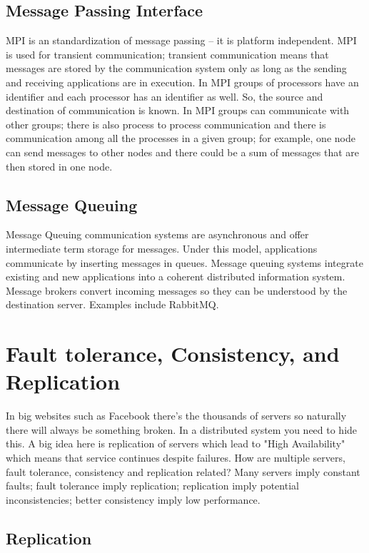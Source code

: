 \documentclass{amsbook}
\begin{document}
\subsection{Message Passing Interface}

MPI is an standardization of message passing -- it is platform independent. MPI is used for transient communication; transient communication means that messages are stored by the communication system only as long as the sending and receiving applications are in execution. In MPI groups of processors have an identifier and each processor has an identifier as well. So, the source and destination of communication is known. In MPI groups can communicate with other groups; there is also process to process communication and there is communication among all the processes in a given group; for example, one node can send messages to other nodes and there could be a sum of messages that are then stored in one node.
\subsection{Message Queuing}

Message Queuing communication systems are asynchronous and offer intermediate term storage for messages. Under this model, applications communicate by inserting messages in queues. Message queuing systems integrate existing and new applications into a coherent distributed information system. Message brokers convert incoming messages so they can be understood by the destination server. Examples include RabbitMQ.

\section{Fault tolerance, Consistency, and Replication}

In big websites such as Facebook there's the thousands of servers so naturally there will always be something broken. In a distributed system you need to hide this. A big idea here is replication of servers which lead to "High Availability" which means that service continues despite failures. How are multiple servers, fault tolerance, consistency and replication related? Many servers imply constant faults; fault tolerance imply replication; replication imply potential inconsistencies; better consistency imply low performance.

\subsection{Replication}
\end{document}
